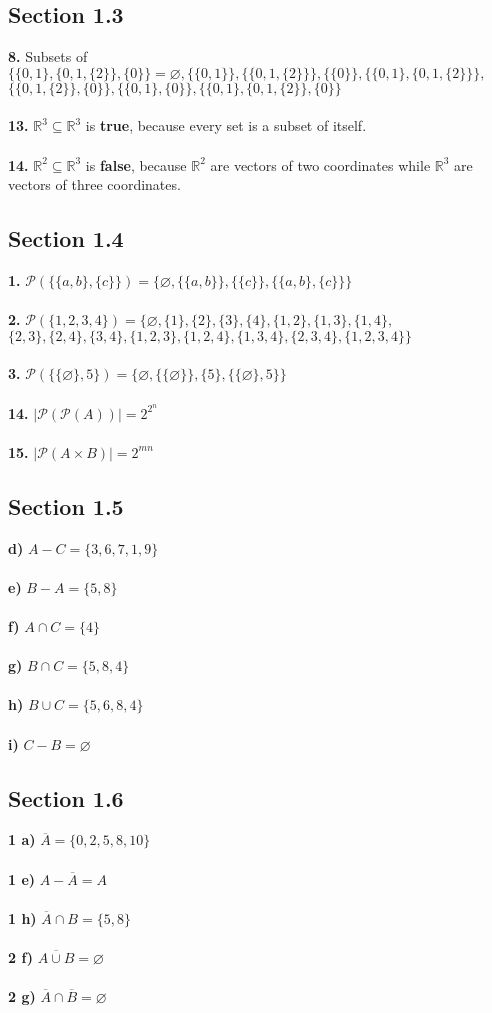 \documentclass[12pt]{article}
\newcommand{\R}{\mathbb{R}}
\let\emptyset\varnothing
\begin{document}
\subsection*{Section 1.3}
\textbf{8.} Subsets of $\{ \{0,1\}, \{0,1,\{2\}\}, \{0\} \} = \emptyset, \{\{0,1\}\}, \{\{0,1,\{2\}\}\}, \{\{0\}\}, \{\{0,1\}, \{0,1,\{2\}\}\}, $\\$\{\{0,1,\{2\}\}, \{0\}\}, \{\{0,1\},\{0\}\}, \{ \{0,1\}, \{0,1,\{2\}\}, \{0\} \}$\\\\
\textbf{13.} $\R^3 \subseteq  \R^3$ is \textbf{true}, because every set is a subset of itself.\\\\
\textbf{14.} $\R^2 \subseteq \R^3$ is \textbf{false}, because $\R^2$ are vectors of two coordinates while $\R^3$ are vectors of three coordinates.
\newpage
\subsection*{Section 1.4}
\textbf{1.} $\mathscr{P}(\{\{a,b\},\{c\}\}) = \{\emptyset,\{\{a,b\}\},\{\{c\}\},\{\{a,b\},\{c\}\}\}$\\\\
\textbf{2.} $\mathscr{P}(\{1,2,3,4\}) = \{\emptyset,\{1\},\{2\},\{3\},\{4\},\{1,2\},\{1,3\},\{1,4\},$\\$\{2,3\},\{2,4\},\{3,4\},\{1,2,3\},\{1,2,4\},\{1,3,4\},\{2,3,4\},\{1,2,3,4\}\}$\\\\
\textbf{3.} $\mathscr{P}(\{\{\emptyset\},5\}) = \{\emptyset,\{\{\emptyset\}\},\{5\},\{\{\emptyset\},5\}\}$\\\\
\textbf{14.} $|\mathscr{P}(\mathscr{P}(A))| = 2^{2^n}$\\\\
\textbf{15.} $|\mathscr{P}(A \times B)| = 2^{mn}$
\subsection*{Section 1.5}
\textbf{d)} $A - C = \{3,6,7,1,9\}$\\\\
\textbf{e)} $B - A = \{5,8\}$\\\\
\textbf{f)} $A \cap C = \{4\}$\\\\
\textbf{g)} $B \cap C = \{5,8,4\}$\\\\
\textbf{h)} $B \cup C = \{5,6,8,4\}$\\\\
\textbf{i)} $C - B = \emptyset$
\subsection*{Section 1.6}
\textbf{1 a)} $\overline{A} = \{0,2,5,8,10\}$\\\\
\textbf{1 e)} $A - \overline{A} = A$\\\\
\textbf{1 h)} $\overline{A} \cap B = \{5,8\}$\\\\
\textbf{2 f)} $\overline{A \cup B} = \emptyset$\\\\
\textbf{2 g)} $\overline{A} \cap \overline{B} = \emptyset$
\end{document}
